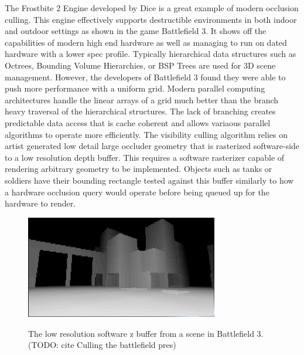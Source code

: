 \documentclass[12pt]{ucthesis}
\newcommand{\captionfonts}{\small\bf\ssp}
\begin{document}
The Frostbite 2 Engine developed by Dice is a great example of modern occlusion culling.\cite{culling-bf}
This engine effectively supports destructible environments in both indoor and outdoor settings as shown in the game Battlefield 3.
It shows off the capabilities of modern high end hardware as well as managing to run on dated hardware with a lower spec profile.
Typically hierarchical data structures such as Octrees, Bounding Volume Hierarchies, or BSP Trees are used for 3D scene management.\cite{CHC, CHCpp, GpuGem-Queries, dpvs}
However, the developers of Battlefield 3 found they were able to push more performance with a uniform grid.
Modern parallel computing architectures handle the linear arrays of a grid much better than the branch heavy traversal of the hierarchical structures.\cite{culling-bf}
The lack of branching creates predictable data access that is cache coherent and allows variaous parallel algorithms to operate more efficiently.
The visibility culling algorithm relies on artist generated low detail large occluder geometry that is rasterized software-side to a low resolution depth buffer.
This requires a software rasterizer capable of rendering arbitrary geometry to be implemented.
Objects such as tanks or soldiers have their bounding rectangle tested against this buffer similarly to how a hardware occlusion query would operate before being queued up for the hardware to render.

\begin{figure}
\begin{center}
\includegraphics[width=0.75\textwidth]{Images/Bf3Buffer.jpg}
\captionfonts
\caption[Software Z Buffer Buffer]{The low resolution software z buffer from a scene in Battlefield 3. (TODO: cite Culling the battlefield pres)}
\label{fig:softare-z}
\end{center}
\end{figure}
\end{document}
